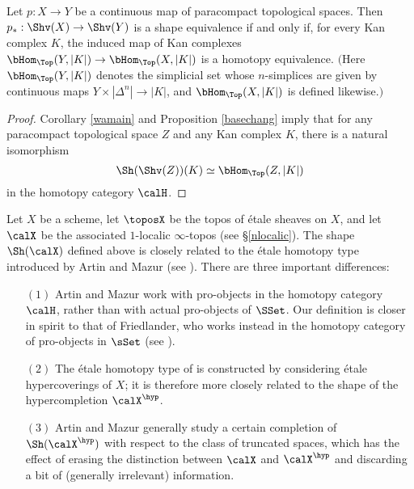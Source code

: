 \begin{proposition}\label{parashape}
Let $p: X \rightarrow Y$ be a continuous map of paracompact topological spaces.
Then $p_{\ast}: \Shv(X) \rightarrow \Shv(Y)$ is a shape equivalence if and only if,
for every Kan complex $K$, the induced map of Kan complexes 
$\bHom_{\Top}(Y, |K|)  \rightarrow \bHom_{\Top}(X, |K|)$ is a homotopy equivalence.
$($Here $\bHom_{\Top}(Y, |K| )$ denotes the simplicial set whose $n$-simplices are
given by continuous maps $Y \times | \Delta^n | \rightarrow |K|$, and
$\bHom_{\Top}(X, |K| )$ is defined likewise.$)$
\end{proposition}

\begin{proof}
Corollary \ref{wamain} and Proposition \ref{basechang} imply that for any paracompact topological space $Z$ and any Kan complex $K$, there is a natural isomorphism
$$ \Sh( \Shv(Z) ) ( K ) \simeq \bHom_{\Top}(Z, |K|)$$ in the homotopy category $\calH$.
\end{proof}

\begin{example}
Let $X$ be a scheme, let $\toposX$ be the topos of \'{e}tale sheaves on $X$, and let
$\calX$ be the associated $1$-localic $\infty$-topos (see \S \ref{nlocalic}). The shape $\Sh(\calX)$ defined above is closely related to the \'{e}tale homotopy type introduced by Artin and Mazur (see \cite{artinmazur}). There are three important differences:
\begin{itemize}
\item[$(1)$] Artin and Mazur work with pro-objects in the homotopy category $\calH$, rather than with actual pro-objects of $\SSet$. Our definition is closer in spirit to that of Friedlander, who works instead in the homotopy category of pro-objects in $\sSet$ (see \cite{fried}).
\item[$(2)$] The \'{e}tale homotopy type of \cite{artinmazur} is constructed by considering \'{e}tale hypercoverings of $X$; it is therefore more closely related to the shape of the hypercompletion
$\calX^{\hyp}$.
\item[$(3)$] Artin and Mazur generally study a certain completion of $\Sh(\calX^{\hyp})$ with respect to the class of truncated spaces, which has the effect of erasing the distinction between $\calX$ and $\calX^{\hyp}$ and discarding a bit of (generally irrelevant) information.
\end{itemize}
\end{example}

